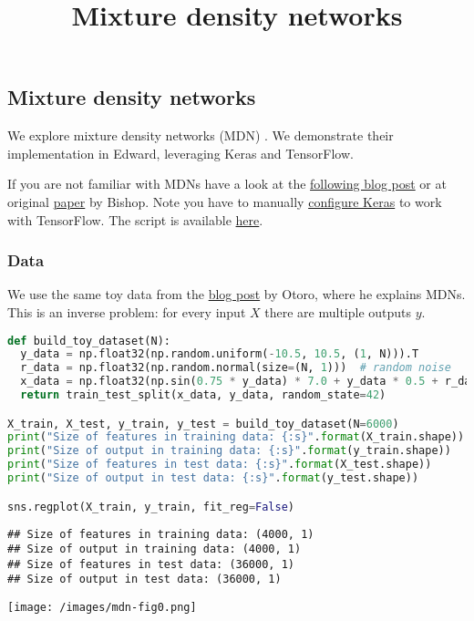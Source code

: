 \title{Mixture density networks}

\subsection{Mixture density networks}

We explore mixture density networks (MDN) \citep{bishop1994mixture}. We
demonstrate their implementation in Edward, leveraging Keras and
TensorFlow.

If you are not familiar with MDNs have a look at the
\href{http://cbonnett.github.io/MDN.html}{following blog post} or at
original
\href{http://research.microsoft.com/en-us/um/people/cmbishop/downloads/Bishop-NCRG-94-004.pdf}{paper}
by Bishop.
Note you have to manually \href{https://keras.io/backend/}
{configure Keras} to work with TensorFlow.
The script is available
\href{https://github.com/blei-lab/edward/blob/master/examples/tf_mixture_density_network_demo.py}
{here}.

\subsubsection{Data}

We use the same toy data from the \href{http://blog.otoro.net/2015/11/24/mixture-density-networks-with-tensorflow/}{blog post} by Otoro, where he explains MDNs. This is an inverse problem: for every input $X$ there are multiple outputs $y$.

\begin{lstlisting}[language=Python]
def build_toy_dataset(N):
  y_data = np.float32(np.random.uniform(-10.5, 10.5, (1, N))).T
  r_data = np.float32(np.random.normal(size=(N, 1)))  # random noise
  x_data = np.float32(np.sin(0.75 * y_data) * 7.0 + y_data * 0.5 + r_data * 1.0)
  return train_test_split(x_data, y_data, random_state=42)

X_train, X_test, y_train, y_test = build_toy_dataset(N=6000)
print("Size of features in training data: {:s}".format(X_train.shape))
print("Size of output in training data: {:s}".format(y_train.shape))
print("Size of features in test data: {:s}".format(X_test.shape))
print("Size of output in test data: {:s}".format(y_test.shape))

sns.regplot(X_train, y_train, fit_reg=False)
\end{lstlisting}

\begin{lstlisting}
## Size of features in training data: (4000, 1)
## Size of output in training data: (4000, 1)
## Size of features in test data: (36000, 1)
## Size of output in test data: (36000, 1)
\end{lstlisting}
\texttt{[image: /images/mdn-fig0.png]}

